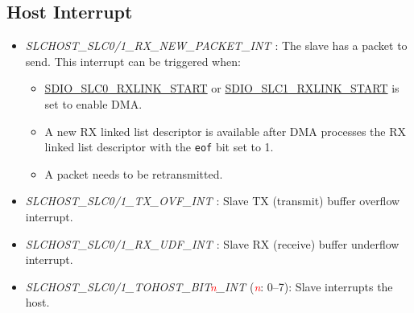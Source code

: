 \documentclass[main\_\_EN.tex]{subfiles}
\begin{document}
\subsection{Host Interrupt}
\begin{itemize}
\item {\it SLCHOST\_SLC0/1\_RX\_NEW\_PACKET\_INT \label{int:SLCHOSTSLC01RXNEWPACKETINT}}: The slave has a packet to send. This interrupt can be triggered when:
        \begin{itemize}
            \item \hyperref[fielddesc:SDIOSLC0RXLINKSTART]{SDIO\_SLC0\_RXLINK\_START} or \hyperref[fielddesc:SDIOSLC1RXLINKSTART]{SDIO\_SLC1\_RXLINK\_START} is set to enable DMA.
            \item A new RX linked list descriptor is available after DMA processes the RX linked list descriptor with the \texttt{eof} bit set to 1.
            \item A packet needs to be retransmitted.
    \end{itemize}
\item {\it SLCHOST\_SLC0/1\_TX\_OVF\_INT \label{int:SLCHOSTSLC01TXOVFINT}}: Slave TX (transmit) buffer overflow interrupt.
\item {\it SLCHOST\_SLC0/1\_RX\_UDF\_INT \label{int:SLCHOSTSLC01RXUDFINT}}: Slave RX (receive) buffer underflow interrupt.
\item {\it SLCHOST\_SLC0/1\_TOHOST\_BIT\textcolor{red}{\it{n}}\_INT \label{int:SLCHOSTSLC01TOHOSTBITnINT}} (\textcolor{red}{\it{n}}: 0–7): Slave interrupts the host.
\end{itemize}
\end{document}
